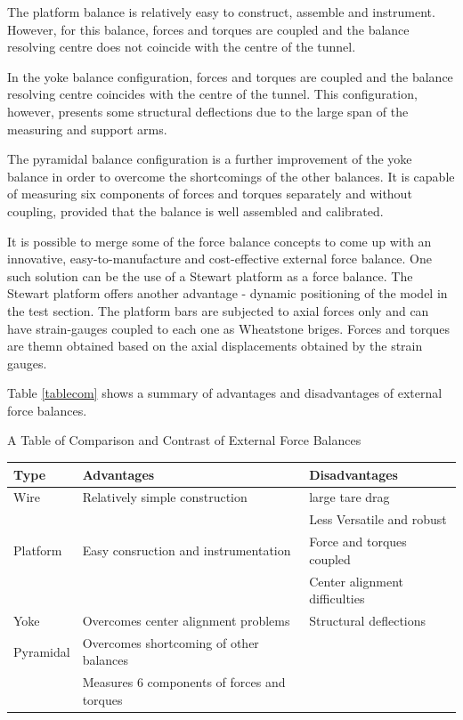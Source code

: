 The platform balance is relatively easy to construct, assemble and instrument. However, for this balance, forces and torques are coupled and the balance resolving centre does not coincide with the centre of the tunnel.
 
In the yoke balance configuration, forces and torques are coupled and the balance resolving centre coincides with the centre of the tunnel. This configuration, however, presents some structural deflections due to the large span of the measuring and support arms.

The pyramidal balance configuration is a further improvement of the yoke balance in order to overcome the shortcomings of the other balances. It is capable of measuring six components of forces and
torques separately and without coupling, provided that the balance is well assembled and calibrated.

It is possible to merge some of the force balance concepts to come up with an innovative, easy-to-manufacture and cost-effective external force balance. One such solution can be the use of a Stewart platform as a force balance. The Stewart platform offers another advantage - dynamic positioning of the model in the test section.
The platform bars are subjected to axial forces only and can have strain-gauges coupled to each one as Wheatstone briges. Forces and torques are themn obtained based on the axial displacements obtained by the strain gauges\cite{fernandes_design_nodate}.

Table \ref{tablecom} shows a summary of advantages and disadvantages of external force balances.
\clearpage
\begin{center}
\begin{table}[!htb]
\caption[Comparison of Force Balances]{A Table of Comparison and Contrast of External Force Balances}
\label{tablecom}
\end{table}
\begin{tabular}{|l|l|l|}
\hline
\textbf{Type} & \textbf{Advantages} & \textbf{Disadvantages}\\
\hline
Wire & Relatively simple construction & large tare drag\\
 & & Less Versatile and robust\\
 \hline
Platform & Easy consruction and instrumentation & Force and torques coupled\\
 & & Center alignment difficulties\\
 \hline
 Yoke & Overcomes center alignment problems & Structural deflections\\
 \hline
 Pyramidal & Overcomes shortcoming of other balances & \\
 & Measures 6 components of forces and torques & \\
 \hline 
\end{tabular}
\end{center}
